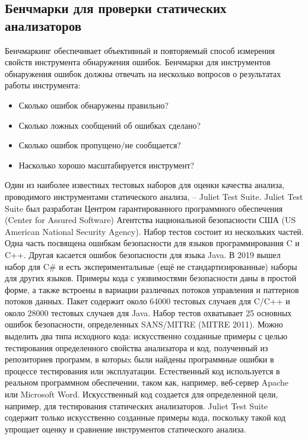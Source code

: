 \subsection{Бенчмарки для проверки статических анализаторов}
Бенчмаркинг обеспечивает объективный и повторяемый способ измерения свойств инструмента обнаружения ошибок. Бенчмарки для инструментов обнаружения 
ошибок должны отвечать на несколько вопросов о результатах работы инструмента\cite{BegBunch}: 
\begin{itemize}
    \item Сколько ошибок обнаружены правильно?
    \item Сколько ложных сообщений об ошибках сделано?
    \item Сколько ошибок пропущено/не сообщается?
    \item Насколько хорошо масштабируется инструмент?
\end{itemize}

Один из наиболее известных тестовых наборов для оценки качества анализа, проводимого инструментами статического анализа, -- Juliet Test Suite\cite{NIST}. Juliet Test Suite был разработан Центром гарантированного 
программного обеспечения (Center for Assured Software) Агентства национальной безопасности США (US American National Security Agency).
Набор тестов состоит из нескольких частей. Одна часть 
посвящена ошибкам безопасности для языков программирования C и C++. Другая касается ошибок безопасности для языка Java. В 2019 вышел набор для C\# и 
есть экспериментальные (ещё не стандартизированные) наборы для других языков. Примеры кода с уязвимостями 
безопасности даны в простой форме, а также встроены в вариации различных потоков управления и паттернов потоков данных. Пакет содержит около 64000 
тестовых случаев для C/C++ и около 28000 тестовых случаев для Java. Набор тестов охватывает 25 основных ошибок безопасности, определенных SANS/MITRE 
(MITRE 2011)\cite{MITRE}. Можно выделить два типа исходного кода: искусственно созданные примеры с целью тестирования определенного свойства 
анализатора и код, полученный из репозиториев программ, в которыx были найдены программные ошибки в процессе тестирования или эксплуатации.
Естественный код используется в реальном программном обеспечении, таком 
как, например, веб-сервер Apache или Microsoft Word. Искусственный код создается для определенной цели, например, для тестирования статических анализаторов. 
Juliet Test Suite содержит только искусственно созданные примеры кода, поскольку такой код упрощает оценку и сравнение инструментов 
статического анализа. 

